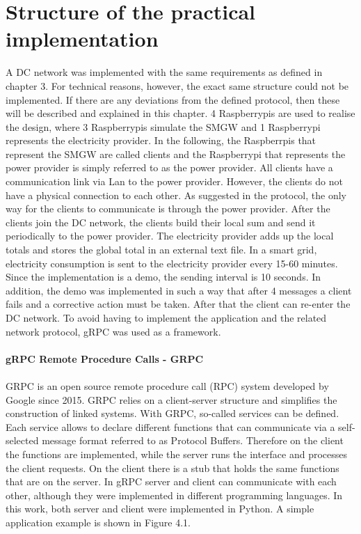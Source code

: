 \section{Structure of the practical implementation}
A DC network was implemented with the same requirements as defined in chapter 3. For technical reasons, however, the exact same structure could not be implemented. If there are any deviations from the defined protocol, then these will be described and explained in this chapter.
4 Raspberrypis are used to realise the design, where 3 Raspberrypis simulate the SMGW and 1 Raspberrypi represents the electricity provider.  In the following, the Raspberrpis that represent the SMGW are called clients and the Raspberrypi that represents the power provider is simply referred to as the power provider. All clients have a communication link via Lan to the power provider. However, the clients do not have a physical connection to each other. As suggested in the protocol, the only way for the clients to communicate is through the power provider. After the clients join the DC network, the clients build their local sum and send it periodically to the power provider. The electricity provider adds up the local totals and stores the global total in an external text file. In a smart grid, electricity consumption is sent to the electricity provider every 15-60 minutes. Since the implementation is a demo, the sending interval is 10 seconds. In addition, the demo was implemented in such a way that after 4 messages a client fails and a corrective action must be taken. After that the client can re-enter the DC network. To avoid having to implement the application and the related network protocol, gRPC was used as a framework.\\
\\
\textbf{gRPC Remote Procedure Calls - GRPC}
\\
\\
GRPC is an open source remote procedure call (RPC) system developed by Google since 2015. GRPC relies on a client-server structure and simplifies the construction of linked systems. With GRPC, so-called services can be defined. Each service allows to declare different functions that can communicate via a self-selected message format referred to as Protocol Buffers. Therefore on the client the functions are implemented, while the server runs the interface and processes the client requests. On the client there is a stub that holds the same functions that are on the server. In gRPC server and client can communicate with each other, although they were implemented in different programming languages. In this work, both server and client were implemented in Python. A simple application example is shown in Figure 4.1.
